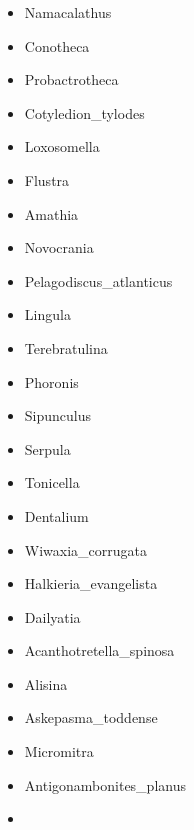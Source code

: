 \documentclass[openany]{book}
\providecommand{\tightlist}{%
  \setlength{\itemsep}{0pt}\setlength{\parskip}{0pt}}
\theoremstyle{definition}
\theoremstyle{definition}
\theoremstyle{definition}
\theoremstyle{remark}
\begin{document}
\begin{itemize}
\tightlist
\item
  Namacalathus\\
\item
  Conotheca\\
\item
  Probactrotheca\\
\item
  Cotyledion\_tylodes\\
\item
  Loxosomella\\
\item
  Flustra\\
\item
  Amathia\\
\item
  Novocrania\\
\item
  Pelagodiscus\_atlanticus\\
\item
  Lingula\\
\item
  Terebratulina\\
\item
  Phoronis\\
\item
  Sipunculus\\
\item
  Serpula\\
\item
  Tonicella\\
\item
  Dentalium\\
\item
  Wiwaxia\_corrugata\\
\item
  Halkieria\_evangelista\\
\item
  Dailyatia\\
\item
  Acanthotretella\_spinosa\\
\item
  Alisina\\
\item
  Askepasma\_toddense\\
\item
  Micromitra\\
\item
  Antigonambonites\_planus\\
\item

\end{itemize}
\end{document}
